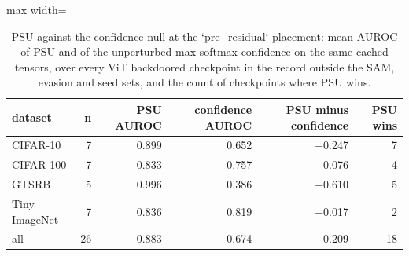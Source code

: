 \begin{table}[htbp]
\centering
\small
\caption{PSU against the confidence null at the `pre_residual` placement: mean AUROC of PSU and of the unperturbed max-softmax confidence on the same cached tensors, over every ViT backdoored checkpoint in the record outside the SAM, evasion and seed sets, and the count of checkpoints where PSU wins.}
\label{tab:confidence-null}
\begin{adjustbox}{max width=\linewidth}
\begin{tabular}{lrrrrr}
\toprule
dataset & n & PSU AUROC & confidence AUROC & PSU minus confidence & PSU wins \\
\midrule
CIFAR-10 & 7 & 0.899 & 0.652 & +0.247 & 7 \\
CIFAR-100 & 7 & 0.833 & 0.757 & +0.076 & 4 \\
GTSRB & 5 & 0.996 & 0.386 & +0.610 & 5 \\
Tiny ImageNet & 7 & 0.836 & 0.819 & +0.017 & 2 \\
all & 26 & 0.883 & 0.674 & +0.209 & 18 \\
\bottomrule
\end{tabular}
\end{adjustbox}
\end{table}
